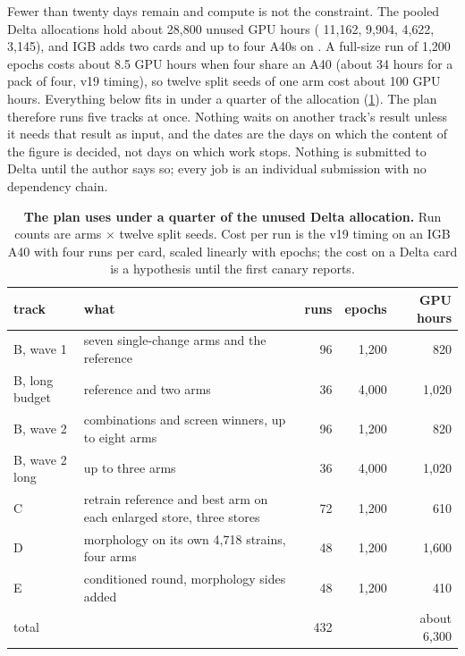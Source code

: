 Fewer than twenty days remain and compute is not the constraint. The pooled Delta
allocations hold about 28{,}800 unused GPU hours ( 11{,}162, 
9{,}904,  4{,}622,  3{,}145), and IGB adds two  cards and
up to four A40s on . A full-size run of 1{,}200 epochs costs about 8.5 GPU hours
when four share an A40 (about 34 hours for a pack of four, v19 timing), so twelve split
seeds of one arm cost about 100 GPU hours. Everything below fits in under a quarter of the
allocation (\cref{tab:plan-budget}). The plan therefore runs five tracks at once. Nothing
waits on another track's result unless it needs that result as input, and the dates are
the days on which the content of the figure is decided, not days on which work stops.
Nothing is submitted to Delta until the author says so; every job is an individual
submission with no dependency chain.

\begin{table}[h]
\footnotesize
\caption[Compute budget of the plan]{\textbf{The plan uses under a quarter of the unused
Delta allocation.} Run counts are arms $\times$ twelve split seeds. Cost per run is the
v19 timing on an IGB A40 with four runs per card, scaled linearly with epochs; the cost on
a Delta card is a hypothesis until the first canary reports. }
\label{tab:plan-budget}
\begin{tabular}{@{}llrrr@{}}
\toprule
track & what & runs & epochs & GPU hours \\
\midrule
B, wave 1 & seven single-change arms and the reference & 96 & 1{,}200 & 820 \\
B, long budget & reference and two arms & 36 & 4{,}000 & 1{,}020 \\
B, wave 2 & combinations and screen winners, up to eight arms & 96 & 1{,}200 & 820 \\
B, wave 2 long & up to three arms & 36 & 4{,}000 & 1{,}020 \\
C & retrain reference and best arm on each enlarged store, three stores & 72 & 1{,}200 & 610 \\
D & morphology on its own 4{,}718 strains, four arms & 48 & 1{,}200 & 1{,}600 \\
E & conditioned round, morphology sides added & 48 & 1{,}200 & 410 \\
\midrule
total & & 432 & & about 6{,}300 \\
\bottomrule
\end{tabular}
\end{table}

